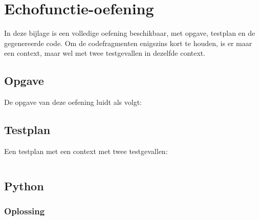 \chapter{Echofunctie-oefening}\label{ch:echo-function-oefening}

In deze bijlage is een volledige oefening beschikbaar, met opgave, testplan en de gegenereerde code.
Om de codefragmenten enigszins kort te houden, is er maar een context, maar wel met twee testgevallen in dezelfde context.

\section{Opgave}\label{sec:echo-function-opgave}

De opgave van deze oefening luidt als volgt:

\begin{quote}
\end{quote}

\section{Testplan}\label{sec:echo-function-testplan}

Een testplan met een context met twee testgevallen:

\inputminted{json}{sources/echo-function/one-testcase.tson}

\section{Python}\label{sec:echo-function-python}

\subsection{Oplossing}\label{subsec:echo-function-python-oplossing}

